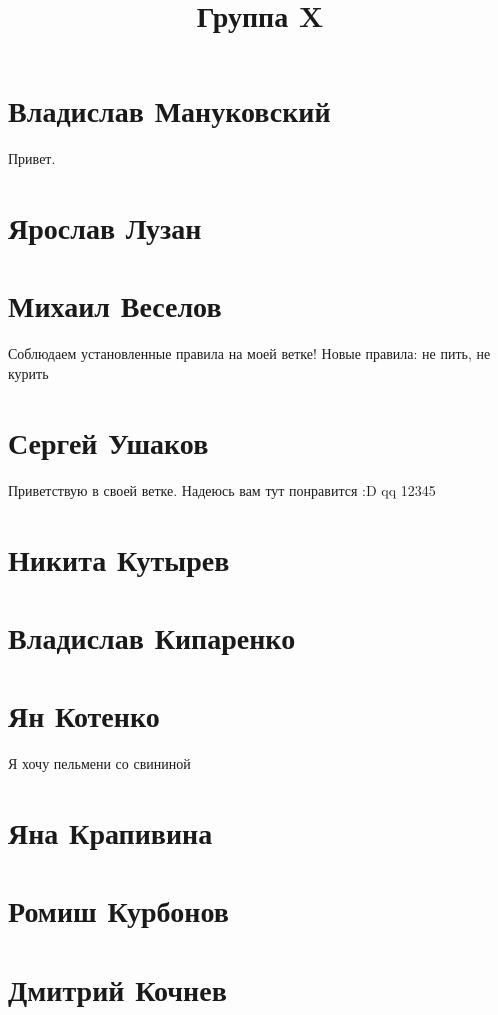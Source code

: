 \documentclass{article}
\title{Группа X}
\begin{document}
\section*{Владислав Мануковский}
Привет.
\section*{Ярослав Лузан}

\section*{Михаил Веселов}

Соблюдаем установленные правила на моей ветке!
Новые правила: не пить, не курить

\section*{Сергей Ушаков}

Приветствую в своей ветке. Надеюсь вам тут понравится :D qq 12345

\section*{Никита Кутырев}

\section*{Владислав Кипаренко}

\section*{Ян Котенко}
Я хочу пельмени со свининой
\section*{Яна Крапивина}

\section*{Ромиш Курбонов}

\section*{Дмитрий Кочнев}
\end{document}
